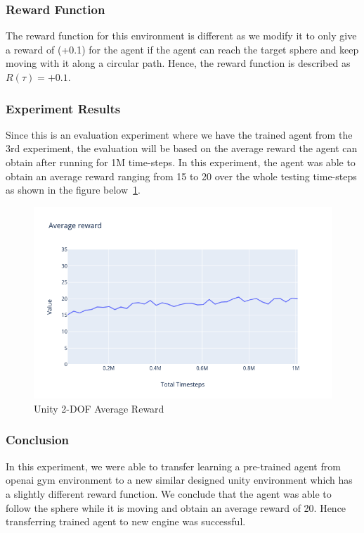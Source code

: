 \subsubsection{Reward Function}

The reward function for this environment is different as we modify it to only give a reward of (+0.1) for the agent if the agent can reach the target sphere and keep moving with it along a circular path. Hence, the reward function is described as \textbf{\(R(\tau)=+0.1\)}.

\subsubsection{Experiment Results}

Since this is an evaluation experiment where we have the trained agent from the 3rd experiment, the evaluation will be based on the average reward the agent can obtain after running for 1M time-steps. In this experiment, the agent was able to obtain an average reward ranging from 15 to 20 over the whole testing time-steps as shown in the figure below~\ref{fig:unity2d_avg_reward}.

\begin{figure}[!htb]
		\centering
		\includegraphics[width=0.7\linewidth]{figures/exps/unity2d.png}
		\caption{Unity 2-DOF Average Reward}
		\label{fig:unity2d_avg_reward}
\end{figure}


\subsubsection{Conclusion}

In this experiment, we were able to transfer learning a pre-trained agent from openai gym environment to a new similar designed unity environment which has a slightly different reward function. We conclude that the agent was able to follow the sphere while it is moving and obtain an average reward of 20. Hence transferring trained agent to new engine was successful.